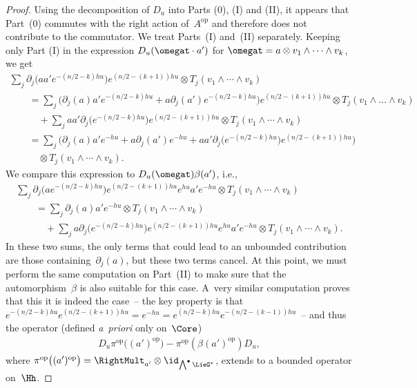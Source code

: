 \begin{proof}
Using the decomposition of $D_u$ into Parts (0), (I) and (II), it appears that Part~(0) commutes with the right action of~$A^\text{op}$ and therefore does not contribute to the commutator. We treat Parts~(I) and~(II) separately. Keeping only Part (I) in the expression $D_u( \omegat \cdot a')$ for $\omegat = a \otimes v_1 \wedge \cdots \wedge v_k$, we get
\begin{gather*}
\sum_j \partial_j\big(a a' e^{-(n/2 - k)h u} \big) e^{(n/2 - (k+1))h u} \otimes T_j( v_1 \wedge \cdots \wedge v_k) \\
\qquad{}
= \sum_j \big(\partial_j( a) a' e^{-(n/2 - k)h u} + a \partial_j(a') e^{-(n/2 - k)h u}\big) e^{(n/2 - (k+1))h u}
 \otimes T_j( v_1 \wedge \ldots \wedge v_k) \\
 \qquad\quad{}
+ \sum_{j} a a' \partial _j\big(e^{-(n/2 - k)h u}\big) e^{(n/2 - (k+1))h u} \otimes T_j(v_1 \wedge \cdots \wedge v_k)\\
\qquad{}
= \sum_{j} \big(\partial _j(a) a' e^{- h u} + a \partial _j(a') e^{-hu} + a a' \partial _j\big(e^{-(n/2 - k)h u}\big) e^{(n/2 - (k+1))h u} \big)\\
\qquad\quad{}
 \otimes T_j(v_1 \wedge \cdots \wedge v_k).
\end{gather*}
We compare this expression to $D_u(\omegat) \beta(a')$, i.e.,
\begin{gather*}
\sum_j \partial_j\big(a e^{-(n/2 - k)h u} \big) e^{(n/2 - (k+1))h u} e^{h u} a' e^{-hu} \otimes T_j( v_1 \wedge \cdots \wedge v_k) \\
\qquad{}= \sum_j \partial_j(a) a' e^{-h u} \otimes T_j( v_1 \wedge \cdots \wedge v_k) \\
\qquad\quad{} + \sum_{j} a \partial _j\big(e^{-(n/2 - k)h u} \big) e^{(n/2 - (k+1))h u} e^{h u} a' e^{-hu} \otimes T_j( v_1 \wedge \cdots \wedge v_k).
\end{gather*}
In these two sums, the only terms that could lead to an unbounded contribution are those containing~$\partial _j(a)$, but these two terms cancel. At this point, we must perform the same computation on Part~(II) to make sure that the automorphism~$\beta$ is also suitable for this case. A~very similar computation proves that this it is indeed the case~-- the key property is that $e^{-(n/2 - k)h u} e^{(n/2 - (k+1))h u} = e^{- hu} = e^{(n/2 - k)h u} e^{-(n/2 - (k-1))h u}$~-- and thus the operator (def\/ined \textit{a~priori} only on~$\Core$)
\begin{gather*}
D_u \pi^\text{op}\big( (a')^\text{op} \big) - \pi^\text{op}( \beta(a')^\text{op}) D_u,
\end{gather*}
where $\pi^\text{op}\big( (a')^\text{op} \big) = \RightMult_{a'} \otimes \id_{\bigwedge^\bullet \LieG^*}$, extends to a bounded operator on~$\Hh$.
\end{proof}

